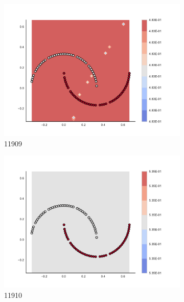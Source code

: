\begin{figure}[h]
\begin{subfigure}[b]{0.09\textwidth}
    \includegraphics[clip, trim=2.35cm 1.75cm 4.5cm 0cm,width=\textwidth]{img/convergence/11909.pdf}
    \caption{11909}
    \label{fig:convergence_11909}
\end{subfigure}
%
\begin{subfigure}[b]{0.09\textwidth}
    \includegraphics[clip, trim=2.35cm 1.75cm 4.5cm 0cm,width=\textwidth]{img/convergence/11910.pdf}
    \caption{11910}
    \label{fig:convergence_11910}
\end{subfigure}
%
\begin{subfigure}[b]{0.09\textwidth}

\end{subfigure}
\end{figure}
